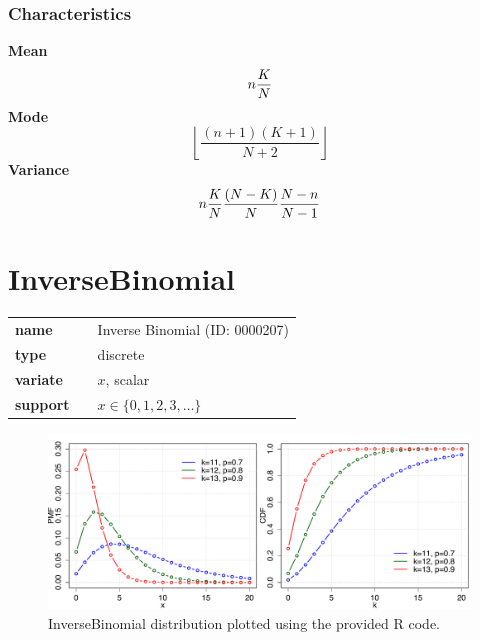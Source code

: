 \subsubsection*{Characteristics}
\smallskip \noindent \hspace{.2cm} \textbf{Mean} 
\begin{equation*}n {K\over N}\end{equation*}
\smallskip \noindent \hspace{.2cm} \textbf{Mode} 
\begin{equation*}\left \lfloor \frac{(n+1)(K+1)}{N+2} \right \rfloor\end{equation*}
\smallskip \noindent \hspace{.2cm} \textbf{Variance} 
\begin{equation*}n{K\over N}{(N-K)\over N}{N-n\over N-1}\end{equation*}
\smallskip
\section*{InverseBinomial} 

  \bigskip 

\begin{tabular}{p{2cm}cl}
\textbf{name} & & Inverse Binomial (ID: 0000207)\\ 
 
\textbf{type} & & discrete \\ 

\textbf{variate} & & $x$, scalar \\ 

\textbf{support} & & $x \in  \{0,1,2,3,\dots\}$
\end{tabular}

\begin{figure}[ht!]
\centering
  \includegraphics[width=140mm]{pics/InverseBinomial.pdf}
 \caption{InverseBinomial distribution plotted using the provided R code.}
 \label{fig:InverseBinomial}
\end{figure}

